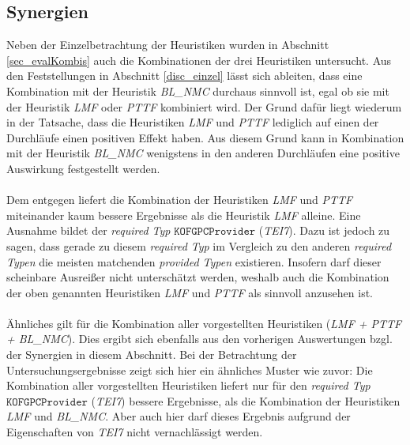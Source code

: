 \subsection{Synergien}\label{disc_synergien}
Neben der Einzelbetrachtung der \Gls{Heuristik}en wurden in Abschnitt \ref{sec_evalKombis} auch die Kombinationen der drei \Gls{Heuristik}en untersucht. Aus den Feststellungen in Abschnitt \ref{disc_einzel} lässt sich ableiten, dass eine Kombination mit der \Gls{Heuristik} \emph{BL\_NMC} durchaus sinnvoll ist, egal ob sie mit der \Gls{Heuristik} \emph{LMF} oder \emph{PTTF} kombiniert wird. Der Grund dafür liegt wiederum in der Tatsache, dass die \Gls{Heuristik}en \emph{LMF} und \emph{PTTF} lediglich auf einen der Durchläufe einen positiven Effekt haben. Aus diesem Grund kann in Kombination mit der Heuristik \emph{BL\_NMC} wenigstens in den anderen Durchläufen eine positive Auswirkung festgestellt werden.
\\\\
Dem entgegen liefert die Kombination der \Gls{Heuristik}en \emph{LMF} und \emph{PTTF} miteinander kaum bessere Ergebnisse als die \Gls{Heuristik} \emph{LMF} alleine. Eine Ausnahme bildet der \emph{required Typ} $\texttt{KOFGPCProvider}$ (\emph{TEI7}). Dazu ist jedoch zu sagen, dass gerade zu diesem \emph{required Typ} im Vergleich zu den anderen \emph{required Typen} die meisten matchenden \emph{provided Typen} existieren. Insofern darf dieser scheinbare Ausreißer nicht unterschätzt werden, weshalb auch die Kombination der oben genannten \Gls{Heuristik}en \emph{LMF} und \emph{PTTF} als sinnvoll anzusehen ist.
\\\\
Ähnliches gilt für die Kombination aller vorgestellten Heuristiken (\emph{LMF + PTTF + BL\_NMC}). Dies ergibt sich ebenfalls aus den vorherigen Auswertungen bzgl. der Synergien in diesem Abschnitt. Bei der Betrachtung der Untersuchungsergebnisse zeigt sich hier ein ähnliches Muster wie zuvor: Die Kombination aller vorgestellten \Gls{Heuristik}en liefert nur für den \emph{required Typ} $\texttt{KOFGPCProvider}$ (\emph{TEI7}) bessere Ergebnisse, als die Kombination der \Gls{Heuristik}en \emph{LMF} und \emph{BL\_NMC}. Aber auch hier darf dieses Ergebnis aufgrund der Eigenschaften von \emph{TEI7} nicht vernachlässigt werden.

